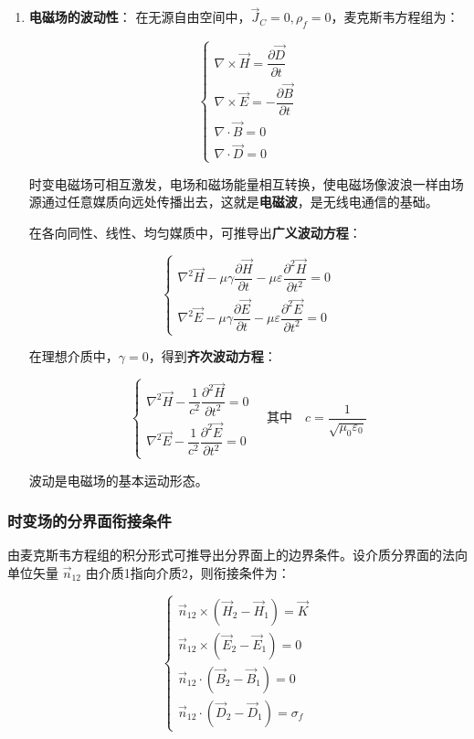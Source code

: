 \begin{enumerate}
    \item \textbf{电磁场的波动性}：
    在无源自由空间中，$\vec{J}_C=0, \rho_f=0$，麦克斯韦方程组为：
    \begin{formulaBox}
    \[
    \begin{cases}
    \nabla \times \vec{H} = \dfrac{\partial \vec{D}}{\partial t} \\
    \nabla \times \vec{E} = -\dfrac{\partial \vec{B}}{\partial t} \\
    \nabla \cdot \vec{B} = 0 \\
    \nabla \cdot \vec{D} = 0
    \end{cases}
    \]
    \end{formulaBox}
    时变电磁场可相互激发，电场和磁场能量相互转换，使电磁场像波浪一样由场源通过任意媒质向远处传播出去，这就是\textbf{电磁波}，是无线电通信的基础。

    在各向同性、线性、均匀媒质中，可推导出\textbf{广义波动方程}：
    \begin{formulaBox}
    \[
    \begin{cases}
    \nabla^2 \vec{H} - \mu\gamma \dfrac{\partial \vec{H}}{\partial t} - \mu\varepsilon \dfrac{\partial^2 \vec{H}}{\partial t^2} = 0 \\[6pt]
    \nabla^2 \vec{E} - \mu\gamma \dfrac{\partial \vec{E}}{\partial t} - \mu\varepsilon \dfrac{\partial^2 \vec{E}}{\partial t^2} = 0
    \end{cases}
    \]
    \end{formulaBox}
    在理想介质中，$\gamma=0$，得到\textbf{齐次波动方程}：
    \begin{formulaBox}
    \[
    \begin{cases}
    \nabla^2 \vec{H} - \dfrac{1}{c^2} \dfrac{\partial^2 \vec{H}}{\partial t^2} = 0 \\[6pt]
    \nabla^2 \vec{E} - \dfrac{1}{c^2} \dfrac{\partial^2 \vec{E}}{\partial t^2} = 0
    \end{cases}
    \quad \text{其中} \quad c = \frac{1}{\sqrt{\mu_0\varepsilon_0}}
    \]
    \end{formulaBox}
    波动是电磁场的基本运动形态。
\end{enumerate}

\subsubsection{时变场的分界面衔接条件}
由麦克斯韦方程组的积分形式可推导出分界面上的边界条件。设介质分界面的法向单位矢量 $\vec{n}_{12}$ 由介质1指向介质2，则衔接条件为：
\begin{formulaBox}
\[
\begin{cases}
\vec{n}_{12} \times (\vec{H}_2 - \vec{H}_1) = \vec{K} \\
\vec{n}_{12} \times (\vec{E}_2 - \vec{E}_1) = 0 \\
\vec{n}_{12} \cdot (\vec{B}_2 - \vec{B}_1) = 0 \\
\vec{n}_{12} \cdot (\vec{D}_2 - \vec{D}_1) = \sigma_f
\end{cases}
\]
\end{formulaBox}

